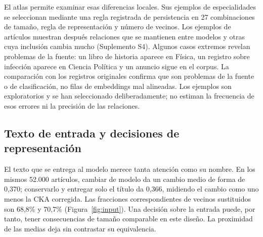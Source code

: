 \documentclass[12pt]{article}
\begin{document}
El atlas permite examinar esas diferencias locales. Sus ejemplos de especialidades se seleccionan mediante una regla registrada de persistencia en 27 combinaciones de tamaño, regla de representación y número de vecinos. Los ejemplos de artículos muestran después relaciones que se mantienen entre modelos y otras cuya inclusión cambia mucho (Suplemento S4). Algunos casos extremos revelan problemas de la fuente: un libro de historia aparece en Física, un registro sobre infección aparece en Ciencia Política y un anuncio sigue en el corpus. La comparación con los registros originales confirma que son problemas de la fuente o de clasificación, no filas de embeddings mal alineadas. Los ejemplos son exploratorios y se han seleccionado deliberadamente; no estiman la frecuencia de esos errores ni la precisión de las relaciones.

\subsection{Texto de entrada y decisiones de representación}
El texto que se entrega al modelo merece tanta atención como su nombre. En los mismos 52.000 artículos, cambiar de modelo da un cambio medio de forma de 0,370; conservarlo y entregar solo el título da 0,366, midiendo el cambio como uno menos la CKA corregida. Las fracciones correspondientes de vecinos sustituidos son 68,8\% y 70,7\% (Figura~\ref{fig:input}). Una decisión sobre la entrada puede, por tanto, tener consecuencias de tamaño comparable en este diseño. La proximidad de las medias deja sin contrastar su equivalencia.

\end{document}
